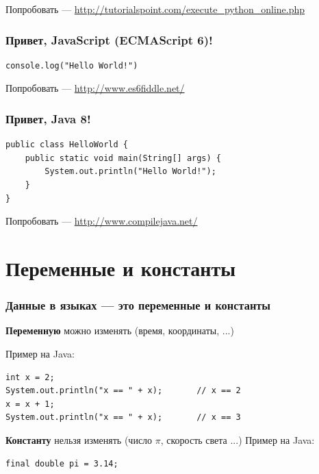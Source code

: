 {\begin{frame}[fragile]
  \vspace{2cm}
  Попробовать --- \url{http://tutorialspoint.com/execute\_python\_online.php}
\end{frame}

\begin{frame}[fragile]
  \frametitle{Привет, JavaScript (ECMAScript 6)!}
  \begin{verbatim}
console.log("Hello World!")
  \end{verbatim}

  \vspace{1.5cm}
  Попробовать --- \url{http://www.es6fiddle.net/}
\end{frame}

\begin{frame}[fragile]
  \frametitle{Привет, Java 8!}
  \begin{verbatim}
public class HelloWorld {
    public static void main(String[] args) {
        System.out.println("Hello World!");
    }
}
  \end{verbatim}

  \vspace{1.5cm}
  Попробовать --- %
\url{http://www.compilejava.net/}
\end{frame}

\section{Переменные и константы}
\begin{frame}[fragile]
  \frametitle{Данные в языках --- это переменные и константы}
  \textbf{Переменную} можно изменять (время, координаты, ...)

  Пример на Java:
  \begin{verbatim}
int x = 2;
System.out.println("x == " + x);       // x == 2
x = x + 1;
System.out.println("x == " + x);       // x == 3
  \end{verbatim}
  \vspace{1cm}
  \textbf{Константу} нельзя изменять (число $\pi$, скорость света ...)
  Пример на Java:
  \begin{verbatim}
final double pi = 3.14;
  \end{verbatim}
\end{frame}

}
